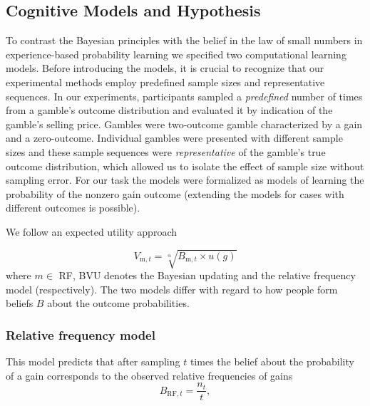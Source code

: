 \documentclass[a4paper, man, natbib, floatsintext]{apa6}
\begin{document}
\subsection{Cognitive Models and Hypothesis}
To contrast the Bayesian principles with the belief in the law of small numbers in experience-based probability learning we specified two computational learning models. Before introducing the models, it is crucial to recognize that our experimental methods employ predefined sample sizes and representative sequences. In our experiments, participants sampled a \textit{predefined} number of times from a gamble's outcome distribution and evaluated it by indication of the gamble's selling price. Gambles were two-outcome gamble characterized by a gain and a zero-outcome. Individual gambles were presented with different sample sizes and these sample sequences were \textit{representative} of the gamble's true outcome distribution, which allowed us to isolate the effect of sample size without sampling error. For our task the models were formalized as models of learning the probability of the nonzero gain outcome (extending the models for cases with different outcomes is possible).

We follow an expected utility approach 

$$V_{\mathrm{m}, t} = \sqrt[\mathrm{\alpha}]{{B}_{\mathrm{m}, t} \times u({g})}$$where $m \in$ RF, BVU denotes the Bayesian updating and the relative frequency model (respectively). The two models differ with regard to how people form beliefs $B$ about the outcome probabilities.

\subsubsection{Relative frequency model}

 This model predicts that after sampling $t$ times the belief about the probability of a gain corresponds to the observed relative frequencies of gains
$${B}_{\mathrm{RF}, t}  =  \frac{n_t}{t} ,$$
\end{document}
